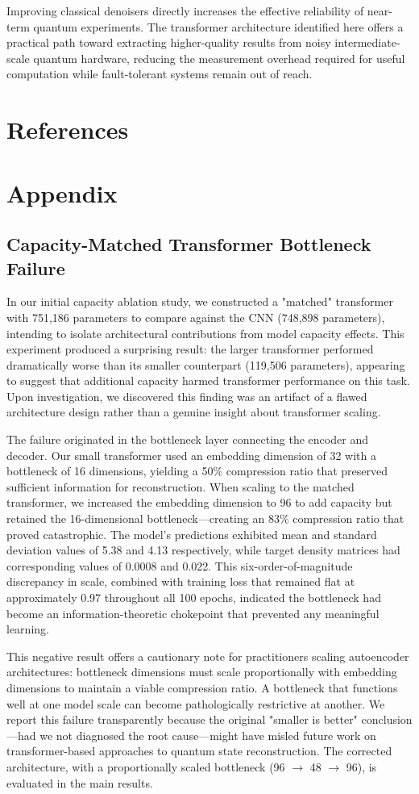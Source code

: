 \documentclass[a4paper, 11pt, colorlinks=true, citecolor=., linkcolor=black, urlcolor=black]{article}
\begin{document}
Improving classical denoisers directly increases the effective reliability of near-term quantum experiments. The transformer architecture identified here offers a practical path toward extracting higher-quality results from noisy intermediate-scale quantum hardware, reducing the measurement overhead required for useful computation while fault-tolerant systems remain out of reach.
\section{References}
\label{sec:orgbf8e12f}
\printbibliography
\section{Appendix}
\label{sec:orgdb25114}
\subsection{Capacity-Matched Transformer Bottleneck Failure}
\label{sec:orgb87f82b}

In our initial capacity ablation study, we constructed a "matched" transformer with 751,186 parameters to compare against the CNN (748,898 parameters), intending to isolate architectural contributions from model capacity effects. This experiment produced a surprising result: the larger transformer performed dramatically worse than its smaller counterpart (119,506 parameters), appearing to suggest that additional capacity harmed transformer performance on this task. Upon investigation, we discovered this finding was an artifact of a flawed architecture design rather than a genuine insight about transformer scaling.

The failure originated in the bottleneck layer connecting the encoder and decoder. Our small transformer used an embedding dimension of 32 with a bottleneck of 16 dimensions, yielding a 50\% compression ratio that preserved sufficient information for reconstruction. When scaling to the matched transformer, we increased the embedding dimension to 96 to add capacity but retained the 16-dimensional bottleneck—creating an 83\% compression ratio that proved catastrophic. The model's predictions exhibited mean and standard deviation values of 5.38 and 4.13 respectively, while target density matrices had corresponding values of 0.0008 and 0.022. This six-order-of-magnitude discrepancy in scale, combined with training loss that remained flat at approximately 0.97 throughout all 100 epochs, indicated the bottleneck had become an information-theoretic chokepoint that prevented any meaningful learning.

This negative result offers a cautionary note for practitioners scaling autoencoder architectures: bottleneck dimensions must scale proportionally with embedding dimensions to maintain a viable compression ratio. A bottleneck that functions well at one model scale can become pathologically restrictive at another. We report this failure transparently because the original "smaller is better" conclusion—had we not diagnosed the root cause—might have misled future work on transformer-based approaches to quantum state reconstruction. The corrected architecture, with a proportionally scaled bottleneck (96 \(\rightarrow\) 48 \(\rightarrow\) 96), is evaluated in the main results.
\end{document}
